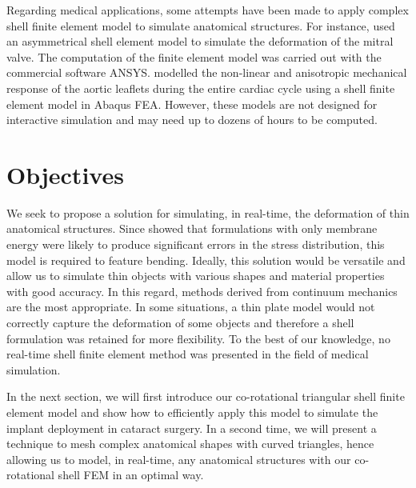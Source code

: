 Regarding medical applications, some attempts have been made to apply complex shell finite element model to simulate anatomical structures. For instance, \cite{Lim05} used an asymmetrical shell element model to simulate the deformation of the mitral valve. The computation of the finite element model was carried out with the commercial software ANSYS. \cite{Conti10} modelled the non-linear and anisotropic mechanical response of the aortic leaflets during the entire cardiac cycle using a shell finite element model in Abaqus FEA. However, these models are not designed for interactive simulation and may need up to dozens of hours to be computed. 


\section{Objectives}

We seek to propose a solution for simulating, in real-time, the deformation of thin anatomical structures. Since \cite{Black91} showed that formulations with only membrane energy were likely to produce significant errors in the stress distribution, this model is required to feature bending. Ideally, this solution would be versatile and allow us to simulate thin objects with various shapes and material properties with good accuracy. In this regard, methods derived from continuum mechanics are the most appropriate. In some situations, a thin plate model would not correctly capture the deformation of some objects and therefore a shell formulation was retained for more flexibility. To the best of our knowledge, no real-time shell finite element method was presented in the field of medical simulation.

In the next section, we will first introduce our co-rotational triangular shell finite element model and show how to efficiently apply this model to simulate the implant deployment in cataract surgery. In a second time, we will present a technique to mesh complex anatomical shapes with curved triangles, hence allowing us to model, in real-time, any anatomical structures with our co-rotational shell FEM in an optimal way. 



